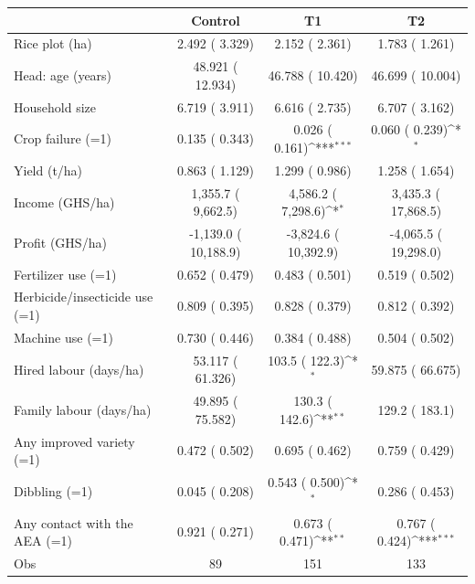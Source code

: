 \def\sym#1{\ifmmode^{#1}\else\(^{#1}\)\fi}
\begin{tabular}{lccc}
\toprule
 & Control & T1 & T2 \\
\midrule
Rice plot (ha) & 2.492 (    3.329) & 2.152 (    2.361) & 1.783 (    1.261) \\
Head: age (years) & 48.921 (   12.934) & 46.788 (   10.420) & 46.699 (   10.004) \\
Household size & 6.719 (    3.911) & 6.616 (    2.735) & 6.707 (    3.162) \\
Crop failure (=1) & 0.135 (    0.343) & 0.026 (    0.161)\sym{***} & 0.060 (    0.239)\sym{*} \\
Yield (t/ha) & 0.863 (    1.129) & 1.299 (    0.986) & 1.258 (    1.654) \\
Income (GHS/ha) & 1,355.7 (     9,662.5) & 4,586.2 (     7,298.6)\sym{*} & 3,435.3 (    17,868.5) \\
Profit (GHS/ha) & -1,139.0 (    10,188.9) & -3,824.6 (    10,392.9) & -4,065.5 (    19,298.0) \\
Fertilizer use (=1) & 0.652 (    0.479) & 0.483 (    0.501) & 0.519 (    0.502) \\
Herbicide/insecticide use (=1) & 0.809 (    0.395) & 0.828 (    0.379) & 0.812 (    0.392) \\
Machine use (=1) & 0.730 (    0.446) & 0.384 (    0.488) & 0.504 (    0.502) \\
Hired labour (days/ha) & 53.117 (   61.326) & 103.5 (       122.3)\sym{*} & 59.875 (   66.675) \\
Family labour (days/ha) & 49.895 (   75.582) & 130.3 (       142.6)\sym{**} & 129.2 (       183.1) \\
Any improved variety (=1) & 0.472 (    0.502) & 0.695 (    0.462) & 0.759 (    0.429) \\
Dibbling (=1) & 0.045 (    0.208) & 0.543 (    0.500)\sym{*} & 0.286 (    0.453) \\
Any contact with the AEA (=1) & 0.921 (    0.271) & 0.673 (    0.471)\sym{**} & 0.767 (    0.424)\sym{***} \\
\midrule
Obs & 89 & 151 & 133 \\
\bottomrule
\end{tabular}
